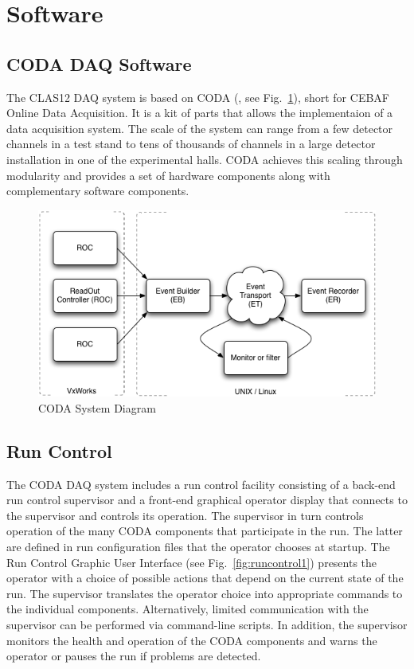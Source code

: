 \section{Software}

\subsection{CODA DAQ Software}

The CLAS12 DAQ system is based on CODA (\cite{coda-ref}, see Fig.~\ref{fig:coda_diagram}), short for CEBAF Online Data Acquisition. It is a kit of parts that allows the implementaion of a data acquisition system. The scale of the system can range from a few detector channels in a test stand to tens of thousands of channels in a large detector installation in one of the experimental halls. CODA achieves this scaling through modularity and provides a set of hardware components along with complementary software components.

\begin{figure}[hbt]
	\centering
	\includegraphics[width=1.0\columnwidth,keepaspectratio]{img/coda_diagram.png}
	\caption{CODA System Diagram}
	\label{fig:coda_diagram}
\end{figure}


\subsection {Run Control}

The CODA DAQ system includes a run control facility consisting of a back-end run control supervisor and a front-end graphical operator display that connects to the supervisor and controls its operation. The supervisor in turn controls operation of the many CODA components that participate in the run. The latter are defined in run configuration files that the operator chooses at startup. The Run Control Graphic User Interface (see Fig.~\ref{fig:runcontrol1}) presents the operator with a choice of possible actions that depend on the current state of the run. The supervisor translates the operator choice into appropriate commands to the individual components. Alternatively, limited communication with the supervisor can be performed via command-line scripts. In addition, the supervisor monitors the health and operation of the CODA components and warns the operator or pauses the run if problems are detected.

